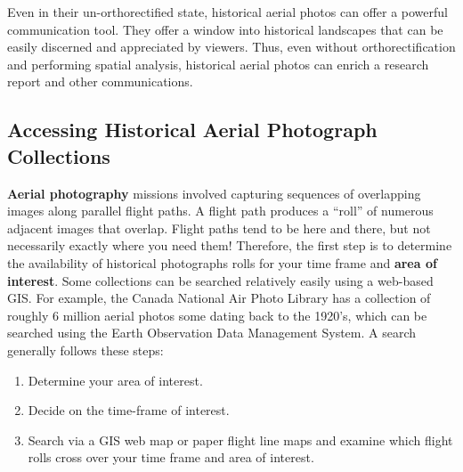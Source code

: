 \documentclass[
]{book}
\providecommand{\tightlist}{%
  \setlength{\itemsep}{0pt}\setlength{\parskip}{0pt}}
\begin{document}
Even in their un-orthorectified state, historical aerial photos can offer a powerful communication tool. They offer a window into historical landscapes that can be easily discerned and appreciated by viewers. Thus, even without orthorectification and performing spatial analysis, historical aerial photos can enrich a research report and other communications.

\subsection{Accessing Historical Aerial Photograph Collections}\label{accessing-historical-aerial-photograph-collections}

\textbf{Aerial photography} missions involved capturing sequences of overlapping images along parallel flight paths. A flight path produces a ``roll'' of numerous adjacent images that overlap. Flight paths tend to be here and there, but not necessarily exactly where you need them! Therefore, the first step is to determine the availability of historical photographs rolls for your time frame and \textbf{area of interest}. Some collections can be searched relatively easily using a web-based GIS. For example, the Canada National Air Photo Library has a collection of roughly 6 million aerial photos some dating back to the 1920's, which can be searched using the Earth Observation Data Management System. A search generally follows these steps:

\begin{enumerate}
\def\labelenumi{\arabic{enumi}.}
\tightlist
\item
  Determine your area of interest.
\item
  Decide on the time-frame of interest.
\item
  Search via a GIS web map or paper flight line maps and examine which flight rolls cross over your time frame and area of interest.
\end{enumerate}
\end{document}
